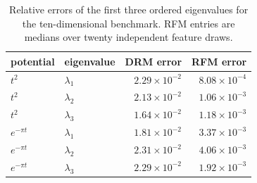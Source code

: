 \begin{table}[!htbp]
\centering
\small
\setlength{\tabcolsep}{4pt}
\caption{Relative errors of the first three ordered eigenvalues for the ten-dimensional benchmark. RFM entries are medians over twenty independent feature draws.}
\label{tab:tenD_summary_new}
\begin{tabular}{llrr}
\toprule
potential & eigenvalue & DRM error & RFM error\\
\midrule
$t^2$ & $\lambda_{1}$ & \(2.29\times 10^{-2}\) & \(8.08\times 10^{-4}\)\\
$t^2$ & $\lambda_{2}$ & \(2.13\times 10^{-2}\) & \(1.06\times 10^{-3}\)\\
$t^2$ & $\lambda_{3}$ & \(1.64\times 10^{-2}\) & \(1.18\times 10^{-3}\)\\
$e^{-\pi t}$ & $\lambda_{1}$ & \(1.81\times 10^{-2}\) & \(3.37\times 10^{-3}\)\\
$e^{-\pi t}$ & $\lambda_{2}$ & \(2.31\times 10^{-2}\) & \(4.06\times 10^{-3}\)\\
$e^{-\pi t}$ & $\lambda_{3}$ & \(2.29\times 10^{-2}\) & \(1.92\times 10^{-3}\)\\
\bottomrule
\end{tabular}
\end{table}
